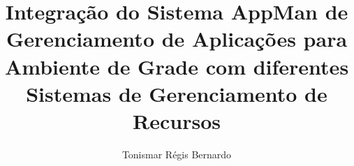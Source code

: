 \documentclass [12pt]{article}
\author {Tonismar Régis Bernardo}
\title {Integração do Sistema AppMan de Gerenciamento de Aplicações para Ambiente de Grade com diferentes Sistemas de Gerenciamento de Recursos}
\begin{document}
\label{start}
	\maketitle
	
	
\label{end}
\end{document}
